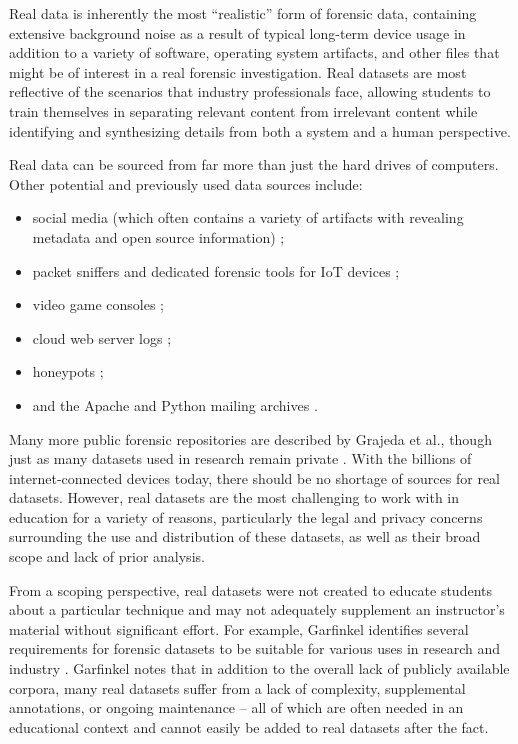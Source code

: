 \documentclass[letterpaper,12pt]{report}
\def\tightlist{}
\begin{document}
Real data is inherently the most ``realistic'' form of forensic data,
containing extensive background noise as a result of typical long-term
device usage in addition to a variety of software, operating system
artifacts, and other files that might be of interest in a real forensic
investigation. Real datasets are most reflective of the scenarios that
industry professionals face, allowing students to train themselves in
separating relevant content from irrelevant content while identifying
and synthesizing details from both a system and a human perspective.

Real data can be sourced from far more than just the hard drives of
computers. Other potential and previously used data sources include:

\begin{itemize}
\tightlist
\item
  social media (which often contains a variety of artifacts with
  revealing metadata and open source information)
  \cite{baggiliDataSourcesAdvancing2015};
\item
  packet sniffers and dedicated forensic tools for IoT devices
  \cite{meffertForensicStateAcquisition2017};
\item
  video game consoles
  \cite{grajedaAvailabilityDatasetsDigital2017,pessolanoForensicAnalysisNintendo2019};
\item
  cloud web server logs \cite{rahmanNewWebForensic2020};
\item
  honeypots \cite{mochForensicImageGenerator2009};
\item
  and the Apache and Python mailing archives
  \cite{grajedaAvailabilityDatasetsDigital2017}.
\end{itemize}

Many more public forensic repositories are described by Grajeda et al.,
though just as many datasets used in research remain private
\cite{grajedaAvailabilityDatasetsDigital2017}. With the billions of
internet-connected devices today, there should be no shortage of sources
for real datasets. However, real datasets are the most challenging to
work with in education for a variety of reasons, particularly the legal
and privacy concerns surrounding the use and distribution of these
datasets, as well as their broad scope and lack of prior analysis.

From a scoping perspective, real datasets were not created to educate
students about a particular technique and may not adequately supplement
an instructor's material without significant effort. For example,
Garfinkel identifies several requirements for forensic datasets to be
suitable for various uses in research and industry
\cite{garfinkelForensicCorporaChallenge2007}. Garfinkel notes that
in addition to the overall lack of publicly available corpora, many real
datasets suffer from a lack of complexity, supplemental annotations, or
ongoing maintenance -- all of which are often needed in an educational
context and cannot easily be added to real datasets after the fact.
\end{document}
